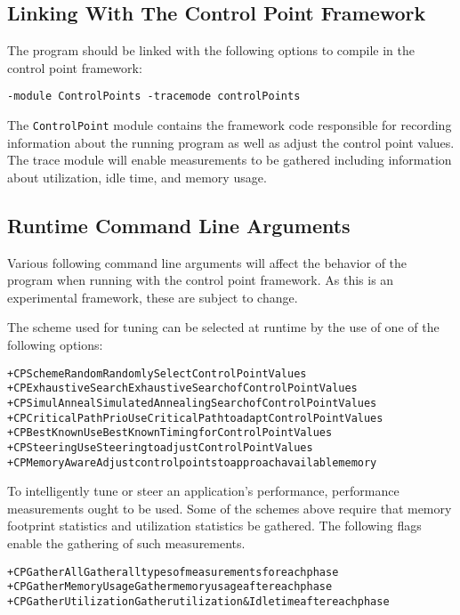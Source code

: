 \subsection{Linking With The Control Point Framework}

The program should be linked with the following options to compile in the control point framework:

\texttt{-module ControlPoints -tracemode controlPoints}

The \texttt{ControlPoint} module contains the framework code responsible for recording information about the running program as well as adjust the control point values. The trace module will enable measurements to be gathered including information about utilization, idle time, and memory usage. 

\subsection{Runtime Command Line Arguments}

Various following command line arguments will affect the behavior of the program when running with the control point framework. As this is an experimental framework, these are subject to change.

The scheme used for tuning can be selected at runtime by the use of one of the following options:
\begin{alltt} 
     +CPSchemeRandom            Randomly Select Control Point Values
 +CPExhaustiveSearch            Exhaustive Search of Control Point Values
      +CPSimulAnneal            Simulated Annealing Search of Control Point Values
 +CPCriticalPathPrio            Use Critical Path to adapt Control Point Values
        +CPBestKnown            Use BestKnown Timing for Control Point Values
         +CPSteering            Use Steering to adjust Control Point Values
      +CPMemoryAware            Adjust control points to approach available memory
\end{alltt} 

To intelligently tune or steer an application's performance, performance measurements ought to be used. Some of the schemes above require that memory footprint statistics and utilization statistics be gathered. The following flags enable the gathering of such measurements.
\begin{alltt} 
        +CPGatherAll            Gather all types of measurements for each phase
+CPGatherMemoryUsage            Gather memory usage after each phase
+CPGatherUtilization            Gather utilization \& Idle time after each phase
\end{alltt} 



